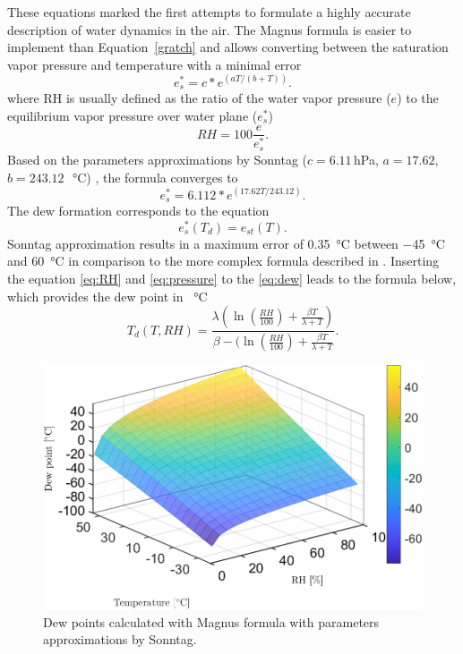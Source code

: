 These equations marked the first attempts to formulate a highly accurate description of water dynamics in the air. The Magnus formula is easier to implement than Equation~\ref{gratch} and allows converting between the saturation vapor pressure and temperature with a minimal error~\cite{magnus}
\begin{equation}
    e^{*}_{s} = c*e^{(aT/(b+T))}.
\end{equation}
where \gls{RH} is usually defined as the ratio of the water vapor pressure ($e$) to the equilibrium vapor pressure over water plane ($e^{*}_{s}$)
\begin{equation}
    RH = 100\frac{e}{e^{*}_{s}}.
    \label{eq:RH}
\end{equation}
Based on the parameters approximations by Sonntag ($c=6.11$\,hPa, $a=17.62$, $b=243.12$\,\SI{}{\celsius}) \cite{magnus}, the formula converges to
\begin{equation}
    e^{*}_{s} = 6.112*e^{(17.62T/243.12)}.
    \label{eq:pressure}
\end{equation}
The dew formation corresponds to the equation
\begin{equation}
    e^{*}_{s}(T_{d}) = e_{st}(T).
    \label{eq:dew}
\end{equation}
Sonntag approximation results in a maximum error of \SI{0.35}{\celsius} between \SI{-45}{\celsius} and \SI{60}{\celsius} in comparison to the more complex formula described in \cite{hardy}. 
Inserting the equation \ref{eq:RH} and \ref{eq:pressure} to the \ref{eq:dew} leads to the formula below, which provides the dew point in \SI{}{\celsius}
\begin{equation}
    T_{d}(T, RH) = \frac{\lambda(\ln(\frac{RH}{100})+\frac{\beta T}{\lambda + T})}{\beta - (\ln(\frac{RH}{100})+\frac{\beta T}{\lambda + T}}.
    \label{eq:td}
\end{equation}
\begin{figure}[!h]
\centering
\includegraphics[width=0.65\columnwidth]{Chapter5/images/dewpointmagnus.png}
\caption{Dew points calculated with Magnus formula with parameters approximations by Sonntag.}
\label{fig:dewpointmagnus}
\end{figure}


